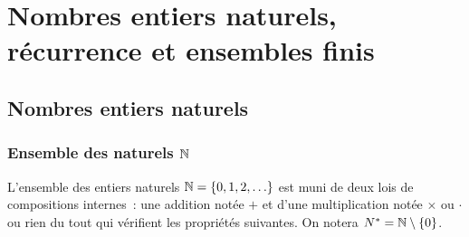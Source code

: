 \chapter{Nombres entiers naturels, récurrence et ensembles finis}
\minitoc
\minilof
\minilot
\label{chap:naturels}
\section{Nombres entiers naturels}

\subsection{Ensemble des naturels $\mathbb{N}$}

L'ensemble des entiers naturels $\mathbb{N}=\{0,1,2,\ldots\}$ est muni de deux lois de compositions internes~: une addition notée $+$ et d'une multiplication notée $\times$ ou $\cdot$ ou rien du tout qui vérifient les propriétés suivantes. On notera $N^*=\mathbb{N}\setminus\{0\}$.

